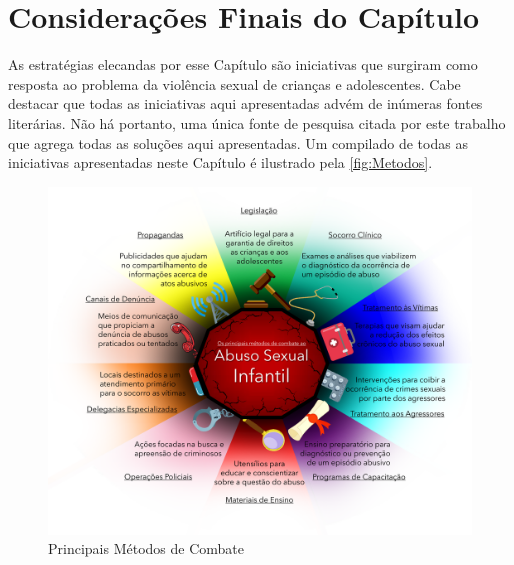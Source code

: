 \newpage


\section{Considerações Finais do Capítulo}\label{sec:finais}


As estratégias elecandas por esse Capítulo são iniciativas que surgiram como resposta ao problema da violência sexual de crianças e adolescentes. Cabe destacar que todas as iniciativas aqui apresentadas advém de inúmeras fontes literárias. Não há portanto, uma única fonte de pesquisa citada por este trabalho que agrega todas as soluções aqui apresentadas. Um compilado de todas as iniciativas apresentadas neste Capítulo é ilustrado pela \autoref{fig:Metodos}.



\begin{figure}[htb]
  
	\caption{\label{fig:Metodos}Principais Métodos de Combate}\vspace{-0.2cm}
  \begin{adjustwidth}{-4.2cm}{-0.0cm}
    \includegraphics[scale=0.65]{./Figuras/MétodosCombate.pdf}
	\end{adjustwidth}\vspace{-1.5cm}

\end{figure}

\newpage




